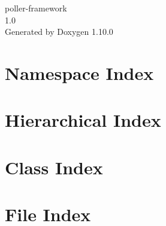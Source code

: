 \documentclass[twoside]{book}
\newcommand{\+}{\discretionary{\mbox{\scriptsize$\hookleftarrow$}}{}{}}
\newcommand{\clearemptydoublepage}{%
    \newpage{\pagestyle{empty}\cleardoublepage}%
  }
\begin{document}
  \raggedbottom
    \hypersetup{pageanchor=false,
                bookmarksnumbered=true,
                pdfencoding=unicode
               }
  \begin{titlepage}
  \vspace*{7cm}
  \begin{center}%
  {\Large poller-\/framework}\\
  [1ex]\large 1.\+0 \\
  \vspace*{1cm}
  {\large Generated by Doxygen 1.10.0}\\
  \end{center}
  \end{titlepage}
  \clearemptydoublepage
  \tableofcontents
  \clearemptydoublepage
  \hypersetup{pageanchor=true}
\chapter{Namespace Index}

\chapter{Hierarchical Index}

\chapter{Class Index}

\chapter{File Index}

\end{document}
